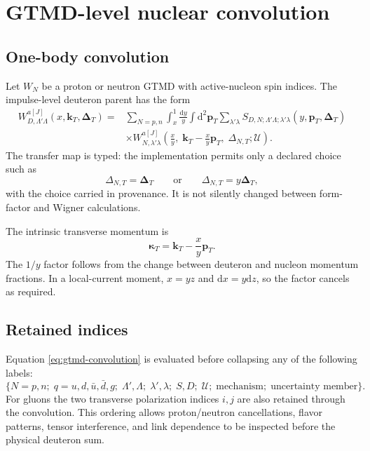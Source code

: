 \documentclass[11pt,oneside]{book}
\newcommand{\kT}{\bm{k}_{T}}
\newcommand{\pT}{\bm{p}_{T}}
\newcommand{\DeltaT}{\bm{\Delta}_{T}}
\newcommand{\dd}{\mathrm{d}}
\begin{document}
\chapter{GTMD-level nuclear convolution}
\label{chap:convolution}

\section{One-body convolution}

Let $W_N$ be a proton or neutron GTMD with active-nucleon spin indices.  The impulse-level deuteron parent has the form
\begin{align}
 W_{D,\Lambda'\Lambda}^{a[J]}(x,\kT,\DeltaT)
 ={}&\sum_{N=p,n}\int_x^1\frac{\dd y}{y}
 \int\dd^2\pT
 \sum_{\lambda'\lambda}
 S_{D,N;\Lambda'\Lambda;\lambda'\lambda}(y,\pT,\DeltaT)
 \nonumber\\
 &\times W_{N,\lambda'\lambda}^{a[J]}
 \left(\frac{x}{y},\;
 \kT-\frac{x}{y}\pT,\;
 \Delta_{N,T};\mathcal U\right).
 \label{eq:gtmd-convolution}
\end{align}
The transfer map is typed: the implementation permits only a declared choice such as
\begin{equation}
 \Delta_{N,T}=\DeltaT
 \qquad\text{or}\qquad
 \Delta_{N,T}=y\DeltaT,
 \label{eq:transfer-map}
\end{equation}
with the choice carried in provenance.  It is not silently changed between form-factor and Wigner calculations.

The intrinsic transverse momentum is
\begin{equation}
 \bm\kappa_T=\kT-\frac{x}{y}\pT.
 \label{eq:intrinsic-kappa}
\end{equation}
The $1/y$ factor follows from the change between deuteron and nucleon momentum fractions.  In a local-current moment, $x=yz$ and $\dd x=y\dd z$, so the factor cancels as required.

\section{Retained indices}

Equation \cref{eq:gtmd-convolution} is evaluated before collapsing any of the following labels:
\begin{equation}
 \{N=p,n;\;q=u,d,\bar u,\bar d,g;\;
 \Lambda',\Lambda;\;\lambda',\lambda;\;
 S,D;\;\mathcal U;\;\text{mechanism};\;\text{uncertainty member}\}.
 \label{eq:retained-labels}
\end{equation}
For gluons the two transverse polarization indices $i,j$ are also retained through the convolution.  This ordering allows proton/neutron cancellations, flavor patterns, tensor interference, and link dependence to be inspected before the physical deuteron sum.
\end{document}
